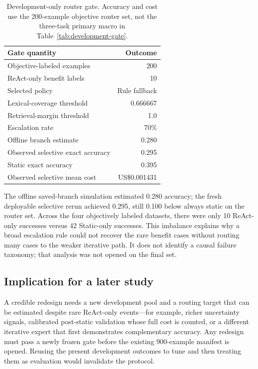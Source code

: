 \begin{table}[t]
  \caption{Development-only router gate. Accuracy and cost use the 200-example objective router set, not the three-task primary macro in Table~\ref{tab:development-gate}.}
  \label{tab:router-gate}
  \centering
  \small
  \begin{tabular}{lr}
    \toprule
    Gate quantity & Outcome \\
    \midrule
    Objective-labeled examples & 200 \\
    ReAct-only benefit labels & 10 \\
    Selected policy & Rule fallback \\
    Lexical-coverage threshold & 0.666667 \\
    Retrieval-margin threshold & 1.0 \\
    Escalation rate & 70\% \\
    Offline branch estimate & 0.280 \\
    Observed selective exact accuracy & 0.295 \\
    Static exact accuracy & 0.395 \\
    Observed selective mean cost & US\$0.001431 \\
    \bottomrule
  \end{tabular}
\end{table}

The offline saved-branch simulation estimated 0.280 accuracy; the fresh deployable selective rerun achieved 0.295, still 0.100 below always static on the router set. Across the four objectively labeled datasets, there were only 10 ReAct-only successes versus 42 Static-only successes. This imbalance explains why a broad escalation rule could not recover the rare benefit cases without routing many cases to the weaker iterative path. It does not identify a causal failure taxonomy; that analysis was not opened on the final set.

\subsection{Implication for a later study}

A credible redesign needs a new development pool and a routing target that can be estimated despite rare ReAct-only events---for example, richer uncertainty signals, calibrated post-static validation whose full cost is counted, or a different iterative expert that first demonstrates complementary accuracy. Any redesign must pass a newly frozen gate before the existing 900-example manifest is opened. Reusing the present development outcomes to tune and then treating them as evaluation would invalidate the protocol.
